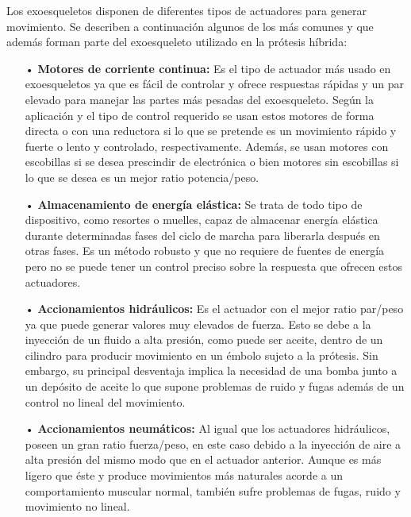 Los exoesqueletos disponen de diferentes tipos de actuadores para generar movimiento. Se describen a continuación algunos de los más comunes y que además forman parte del exoesqueleto utilizado en la prótesis híbrida\cite{estudio_exoesqueletos}\cite{tesis_antonio}\cite{actuadores_exoesqueletos}:

\begin{itemize}
\item[•]\textbf{Motores de corriente continua:} Es el tipo de actuador más usado en exoesqueletos ya que es fácil de controlar y ofrece respuestas rápidas y un par elevado para manejar las partes más pesadas del exoesqueleto. Según la aplicación y el tipo de control requerido se usan estos motores de forma directa o con una reductora si lo que se pretende es un movimiento rápido y fuerte o lento y controlado, respectivamente. Además, se usan motores con escobillas si se desea prescindir de electrónica o bien motores sin escobillas si lo que se desea es un mejor ratio potencia/peso.

\item[•]\textbf{Almacenamiento de energía elástica:} Se trata de todo tipo de dispositivo, como resortes o muelles, capaz de almacenar energía elástica durante determinadas fases del ciclo de marcha para liberarla después en otras fases. Es un método robusto y que no requiere de fuentes de energía pero no se puede tener un control preciso sobre la respuesta que ofrecen estos actuadores.

\item[•]\textbf{Accionamientos hidráulicos:} Es el actuador con el mejor ratio par/peso ya que puede generar valores muy elevados de fuerza. Esto se debe a la inyección de un fluido a alta presión, como puede ser aceite, dentro de un cilindro para producir movimiento en un émbolo sujeto a la prótesis. Sin embargo, su principal desventaja implica la necesidad de una bomba junto a un depósito de aceite lo que supone problemas de ruido y fugas además de un control no lineal del movimiento.

\item[•]\textbf{Accionamientos neumáticos:} Al igual que los actuadores hidráulicos, poseen un gran ratio fuerza/peso, en este caso debido a la inyección de aire a alta presión del mismo modo que en el actuador anterior. Aunque es más ligero que éste y produce movimientos más naturales acorde a un comportamiento muscular normal, también sufre problemas de fugas, ruido y movimiento no lineal.





\end{itemize}
